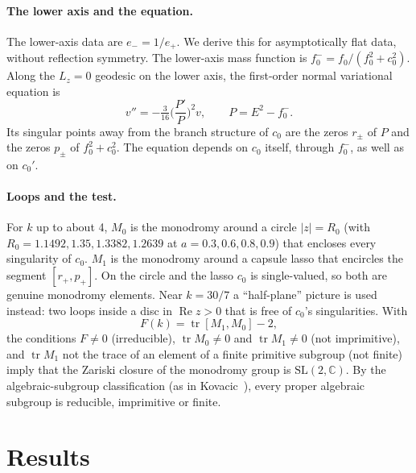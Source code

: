 \documentclass[11pt,a4paper]{article}
\newcommand{\tr}{\operatorname{tr}}
\newcommand{\SL}{\mathrm{SL}(2,\mathbb{C})}
\begin{document}
\paragraph{The lower axis and the equation.} The lower-axis data are $e_-=1/e_+$. We derive this for
asymptotically flat data, without reflection symmetry. The lower-axis mass function is $f_0^-=f_0/(f_0^2+c_0^2)$.
Along the $L_z=0$ geodesic on the lower axis, the first-order normal variational equation is
\begin{equation}
v''=-\tfrac{3}{16}\Big(\frac{P'}{P}\Big)^2 v,\qquad P=E^2-f_0^-.
\end{equation}
Its singular points away from the branch structure of $c_0$ are the zeros $r_\pm$ of $P$ and the zeros $p_\pm$ of
$f_0^2+c_0^2$. The equation depends on $c_0$ itself, through $f_0^-$, as well as on $c_0'$.

\paragraph{Loops and the test.} For $k$ up to about 4, $M_0$ is the monodromy around a circle $|z|=R_0$ (with
$R_0=1.1492,1.35,1.3382,1.2639$ at $a=0.3,0.6,0.8,0.9$) that encloses every singularity of $c_0$. $M_1$ is the
monodromy around a capsule lasso that encircles the segment $[r_+,p_+]$. On the circle and the lasso $c_0$ is
single-valued, so both are genuine monodromy elements. Near $k=30/7$ a ``half-plane'' picture is used instead: two
loops inside a disc in $\operatorname{Re}z>0$ that is free of $c_0$'s singularities. With
\[
F(k)=\tr[M_1,M_0]-2,
\]
the conditions $F\neq0$ (irreducible), $\tr M_0\neq0$ and $\tr M_1\neq0$ (not imprimitive), and $\tr M_1$ not the
trace of an element of a finite primitive subgroup (not finite) imply that the Zariski closure of the monodromy
group is $\SL$. By the algebraic-subgroup classification (as in Kovacic~\cite{Kovacic1986}), every proper algebraic
subgroup is reducible, imprimitive or finite.

\section{Results}
\end{document}
